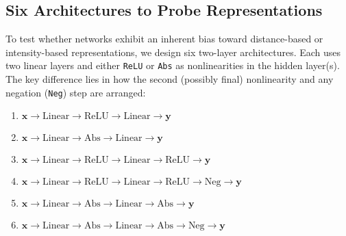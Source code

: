 \subsection{Six Architectures to Probe Representations}
\label{sec:architectures}
To test whether networks exhibit an inherent bias toward distance-based or intensity-based representations, we design six two-layer architectures. Each uses two linear layers and either \texttt{ReLU} or \texttt{Abs} as nonlinearities in the hidden layer(s). The key difference lies in how the second (possibly final) nonlinearity and any negation (\texttt{Neg}) step are arranged:
\begin{enumerate}
    \item \(\mathbf{x} \rightarrow \text{Linear} \rightarrow \text{ReLU} \rightarrow \text{Linear} \rightarrow \mathbf{y}\)
    \item \(\mathbf{x} \rightarrow \text{Linear} \rightarrow \text{Abs} \rightarrow \text{Linear} \rightarrow \mathbf{y}\)
    \item \(\mathbf{x} \rightarrow \text{Linear} \rightarrow \text{ReLU} \rightarrow \text{Linear} \rightarrow \text{ReLU} \rightarrow \mathbf{y}\)
    \item \(\mathbf{x} \rightarrow \text{Linear} \rightarrow \text{ReLU} \rightarrow \text{Linear} \rightarrow \text{ReLU} \rightarrow \text{Neg} \rightarrow \mathbf{y}\)
    \item \(\mathbf{x} \rightarrow \text{Linear} \rightarrow \text{Abs} \rightarrow \text{Linear} \rightarrow \text{Abs} \rightarrow \mathbf{y}\)
    \item \(\mathbf{x} \rightarrow \text{Linear} \rightarrow \text{Abs} \rightarrow \text{Linear} \rightarrow \text{Abs} \rightarrow \text{Neg} \rightarrow \mathbf{y}\)
\end{enumerate}

